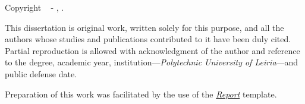 {{    \noindent Copyright \textcopyright~\the\year{} - \GetFirstAuthor, \GetSchool.
    
    \vspace{.575em}
    
    \noindent This dissertation is original work, written solely for this purpose, and all the authors whose studies and publications contributed to it have been duly cited. Partial reproduction is allowed with acknowledgment of the author and reference to the degree, academic year, institution---\textit{Polytechnic University of Leiria}---and public defense date.

    \vspace{1.395em}
    
    \noindent{}
    
    \vspace{.935em}

    \noindent Preparation of this work was facilitated by the use of the \href{https://github.com/joseareia/ipleiria-thesis}{\textit{Report}} template.
}}

\vspace*{\fill}
\MediaOptionLogic